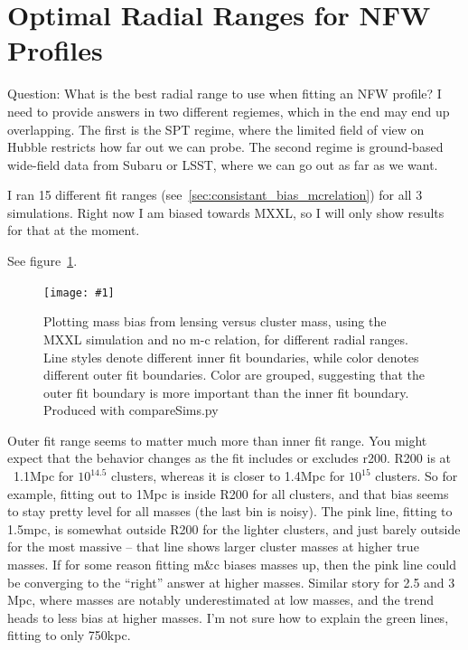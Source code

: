 \documentclass[11pt]{article}
\newcommand{\logfig}[2]{
See figure~\ref{fig:#1}.
\begin{figure}[!ht] 
\texttt{[image: \#1]} 
\caption{#2} 
\label{fig:#1} 
\end{figure}
}
\begin{document}
\clearpage \newpage



\section{Optimal Radial Ranges for NFW Profiles}

Question: What is the best radial range to use when fitting an NFW profile? I need to provide answers in two different regiemes, which in the end may end up overlapping. The first is the SPT regime, where the limited field of view on Hubble restricts how far out we can probe. The second regime is ground-based wide-field data from Subaru or LSST, where we can go out as far as we want.

I ran 15 different fit ranges (see~\ref{sec:consistant_bias_mcrelation}) for all 3 simulations. Right now I am biased towards MXXL, so I will only show results for that at the moment.

\logfig{figures/cfree}{Plotting mass bias from lensing versus cluster mass, using the MXXL simulation and no m-c relation, for different radial ranges. Line styles denote different inner fit boundaries, while color denotes different outer fit boundaries. Color are grouped, suggesting that the outer fit boundary is more important than the inner fit boundary. Produced with compareSims.py}

Outer fit range seems to matter much more than inner fit range. You might expect that the behavior changes as the fit includes or excludes r200. R200 is at ~1.1Mpc for $10^{14.5}$ clusters, whereas it is closer to 1.4Mpc for $10^{15}$ clusters. So for example, fitting out to 1Mpc is inside R200 for all clusters, and that bias seems to stay pretty level for all masses (the last bin is noisy). The pink line, fitting to 1.5mpc, is somewhat outside R200 for the lighter clusters, and just barely outside for the most massive -- that line shows larger cluster masses at higher true masses. If for some reason fitting m\&c biases masses up, then the pink line could be converging to the ``right'' answer at higher masses. Similar story for 2.5 and 3 Mpc, where masses are notably underestimated at low masses, and the trend heads to less bias at higher masses. I'm not sure how to explain the green lines, fitting to only 750kpc. 
\end{document}
